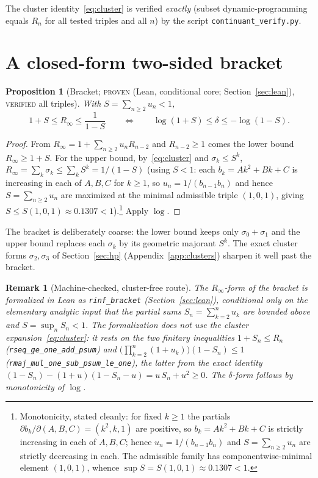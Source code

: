 \documentclass[11pt]{article}
\newtheorem{proposition}{Proposition}
\newtheorem{remark}{Remark}
\newcommand{\Rinf}{R_\infty}
\begin{document}
The cluster identity~\eqref{eq:cluster} is verified \emph{exactly} (subset
dynamic-programming equals $R_n$ for all tested triples and all $n$) by the script
\texttt{continuant\_verify.py}.

\section{A closed-form two-sided bracket}\label{sec:bracket}

\begin{proposition}[Bracket; \textsc{proven} (Lean, conditional core; Section~\ref{sec:lean}), \textsc{verified} all triples]
\label{prop:bracket}
With $S=\sum_{n\ge2}u_n<1$,
\[
  1+S\le\Rinf\le\frac{1}{1-S}
  \qquad\Longleftrightarrow\qquad
  \log(1+S)\le\delta\le-\log(1-S).
\]
\end{proposition}

\begin{proof}
From $\Rinf=1+\sum_{n\ge2}u_nR_{n-2}$ and $R_{n-2}\ge1$ comes the lower bound
$\Rinf\ge1+S$. For the upper bound, by~\eqref{eq:cluster} and $\sigma_k\le S^k$,
$\Rinf=\sum_k\sigma_k\le\sum_k S^k=1/(1-S)$ (using $S<1$: each $b_k=Ak^2+Bk+C$ is
increasing in each of $A,B,C$ for $k\ge1$, so $u_n=1/(b_{n-1}b_n)$ and hence
$S=\sum_{n\ge2}u_n$ are maximized at the minimal admissible triple $(1,0,1)$, giving
$S\le S(1,0,1)\approx0.1307<1$).\footnote{Monotonicity, stated cleanly: for fixed
$k\ge1$ the partials $\partial b_k/\partial(A,B,C)=(k^2,k,1)$ are positive, so
$b_k=Ak^2+Bk+C$ is strictly increasing in each of $A,B,C$; hence $u_n=1/(b_{n-1}b_n)$
and $S=\sum_{n\ge2}u_n$ are strictly decreasing in each. The admissible family has
componentwise-minimal element $(1,0,1)$, whence $\sup S=S(1,0,1)\approx0.1307<1$.}
Apply $\log$.
\end{proof}

\noindent The bracket is deliberately coarse: the lower bound keeps only
$\sigma_0+\sigma_1$ and the upper bound replaces each $\sigma_k$ by its geometric
majorant $S^k$. The exact cluster forms $\sigma_2,\sigma_3$ of
Section~\ref{sec:hp} (Appendix~\ref{app:clusters}) sharpen it well past the bracket.

\begin{remark}[Machine-checked, cluster-free route]
The $\Rinf$-form of the bracket is formalized in Lean as \texttt{rinf\_bracket}
(Section~\ref{sec:lean}), \emph{conditional} only on the elementary analytic input
that the partial sums $S_n=\sum_{k=2}^n u_k$ are bounded above and $S=\sup_nS_n<1$.
The formalization does not use the cluster expansion~\eqref{eq:cluster}: it rests on
the two finitary inequalities $1+S_n\le R_n$ (\texttt{rseq\_ge\_one\_add\_psum}) and
$\bigl(\prod_{k=2}^n(1+u_k)\bigr)(1-S_n)\le1$
(\texttt{rmaj\_mul\_one\_sub\_psum\_le\_one}), the latter from the exact identity
$(1-S_n)-(1+u)(1-S_n-u)=u\,S_n+u^2\ge0$. The $\delta$-form follows by monotonicity
of $\log$.
\end{remark}
\end{document}
